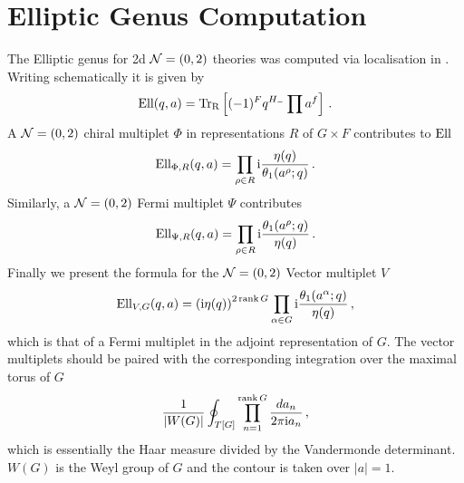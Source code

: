 \documentclass[main.tex]{subfiles}
\begin{document}
\section{Elliptic Genus Computation}\label{App:EllipticGenus}
The Elliptic genus for 2d $\mathcal{N}=(0,2)$ theories was computed via localisation in \cite{Benini:2013nda,Benini:2013xpa}. Writing schematically it is given by
\begin{equation}
\textrm{Ell}(q,a)=\operatorname{Tr}_{\text{R}}\left[(-1)^Fq^{H_-}\prod a^f\right]\,.
\end{equation}
A $\mathcal{N}=(0,2)$ chiral multiplet $\Phi$ in representations $R$ of $G\times F$ contributes to $\textrm{Ell}$
\begin{equation}
\textrm{Ell}_{\Phi,R}(q,a)=\prod_{\rho\in R}\mathrm{i}\frac{\eta(q)}{\theta_1(a^{\rho};q)}\,.
\end{equation}
Similarly, a $\mathcal{N}=(0,2)$ Fermi multiplet $\Psi$ contributes
\begin{equation}
\textrm{Ell}_{\Psi,R}(q,a)=\prod_{\rho\in R}\mathrm{i}\frac{\theta_1(a^{\rho};q)}{\eta(q)}\,.
\end{equation}
Finally we present the formula for the $\mathcal{N}=(0,2)$ Vector multiplet $V$
\begin{equation}
\textrm{Ell}_{V,G}(q,a)=\left(\mathrm{i}\eta(q)\right)^{2\operatorname{rank} G}\prod_{\alpha\in G}\mathrm{i}\frac{\theta_1(a^{\alpha};q)}{\eta(q)}\,,
\end{equation}
which is that of a Fermi multiplet in the adjoint representation of $G$.
The vector multiplets should be paired with the corresponding integration over the maximal torus of $G$
\begin{equation}
\frac{1}{|W(G)|}\oint_{T[G]}\prod_{n=1}^{\operatorname{rank} G}\frac{da_n}{2\pi\mathrm{i} a_n}\,,
\end{equation}
which is essentially the Haar measure divided by the Vandermonde determinant. $W(G)$ is the Weyl group of $G$ and the contour is taken over $|a|=1$. 
\end{document}
